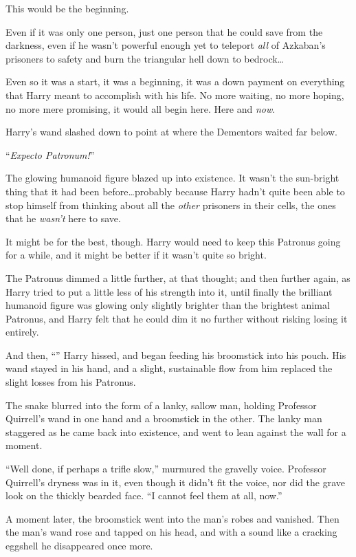 This would be the beginning.

Even if it was only one person, just one person that he could save from the darkness, even if he wasn’t powerful enough yet to teleport \emph{all} of Azkaban’s prisoners to safety and burn the triangular hell down to bedrock…

Even so it was a start, it was a beginning, it was a down payment on everything that Harry meant to accomplish with his life. No more waiting, no more hoping, no more mere promising, it would all begin here. Here and \emph{now}.

Harry’s wand slashed down to point at where the Dementors waited far below.

“\emph{Expecto Patronum!}”

The glowing humanoid figure blazed up into existence. It wasn’t the sun-bright thing that it had been before…probably because Harry hadn’t quite been able to stop himself from thinking about all the \emph{other} prisoners in their cells, the ones that he \emph{wasn’t} here to save.

It might be for the best, though. Harry would need to keep this Patronus going for a while, and it might be better if it wasn’t quite so bright.

The Patronus dimmed a little further, at that thought; and then further again, as Harry tried to put a little less of his strength into it, until finally the brilliant humanoid figure was glowing only slightly brighter than the brightest animal Patronus, and Harry felt that he could dim it no further without risking losing it entirely.

And then, “” Harry hissed, and began feeding his broomstick into his pouch. His wand stayed in his hand, and a slight, sustainable flow from him replaced the slight losses from his Patronus.

The snake blurred into the form of a lanky, sallow man, holding Professor Quirrell’s wand in one hand and a broomstick in the other. The lanky man staggered as he came back into existence, and went to lean against the wall for a moment.

“Well done, if perhaps a trifle slow,” murmured the gravelly voice. Professor Quirrell’s dryness was in it, even though it didn’t fit the voice, nor did the grave look on the thickly bearded face.
“I cannot feel them at all, now.”

A moment later, the broomstick went into the man’s robes and vanished. Then the man’s wand rose and tapped on his head, and with a sound like a cracking eggshell he disappeared once more.

